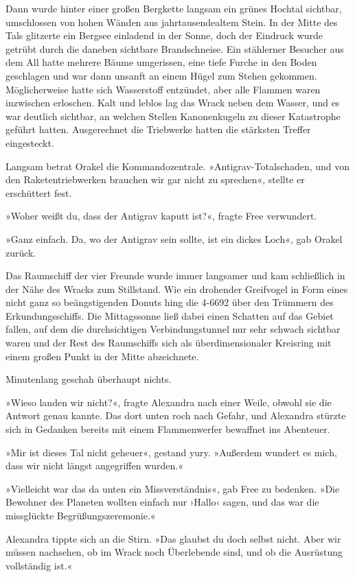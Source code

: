 Dann wurde hinter einer großen Bergkette langsam ein grünes Hochtal sichtbar, umschlossen von hohen Wänden aus jahrtausendealtem Stein. In der Mitte des Tals glitzerte ein Bergsee einladend in der Sonne, doch der Eindruck wurde getrübt durch die daneben sichtbare Brandschneise. Ein stählerner Besucher aus dem All hatte mehrere Bäume umgerissen, eine tiefe Furche in den Boden geschlagen und war dann unsanft an einem Hügel zum Stehen gekommen. Möglicherweise hatte sich Wasserstoff entzündet, aber alle Flammen waren inzwischen erloschen. Kalt und leblos lag das Wrack neben dem Wasser, und es war deutlich sichtbar, an welchen Stellen Kanonenkugeln zu dieser Katastrophe geführt hatten. Ausgerechnet die Triebwerke hatten die stärksten Treffer eingesteckt.

Langsam betrat Orakel die Kommandozentrale. »Antigrav-Totalschaden, und von den Raketentriebwerken brauchen wir gar nicht zu sprechen«, stellte er erschüttert fest.

»Woher weißt du, dass der Antigrav kaputt ist?«, fragte Free verwundert.

»Ganz einfach. Da, wo der Antigrav sein sollte, ist ein dickes Loch«, gab Orakel zurück.

Das Raumschiff der vier Freunde wurde immer langsamer und kam schließlich in der Nähe des Wracks zum Stillstand. Wie ein drohender Greifvogel in Form eines nicht ganz so beängstigenden Donuts hing die 4-6692 über den Trümmern des Erkundungsschiffs. Die Mittagssonne ließ dabei einen Schatten auf das Gebiet fallen, auf dem die durchsichtigen Verbindungstunnel nur sehr schwach sichtbar waren und der Rest des Raumschiffs sich als überdimensionaler Kreisring mit einem großen Punkt in der Mitte abzeichnete.

Minutenlang geschah überhaupt nichts.

»Wieso landen wir nicht?«, fragte Alexandra nach einer Weile, obwohl sie die Antwort genau kannte. Das dort unten roch nach Gefahr, und Alexandra stürzte sich in Gedanken bereits mit einem Flammenwerfer bewaffnet ins Abenteuer.

»Mir ist dieses Tal nicht geheuer«, gestand yury. »Außerdem wundert es mich, dass wir nicht längst angegriffen wurden.«

»Vielleicht war das da unten ein Missverständnis«, gab Free zu bedenken. »Die Bewohner des Planeten wollten einfach nur ›Hallo‹ sagen, und das war die missglückte Begrüßungszeremonie.«

Alexandra tippte sich an die Stirn. »Das glaubst du doch selbst nicht. Aber wir müssen nachsehen, ob im Wrack noch Überlebende sind, und ob die Ausrüstung vollständig ist.«

